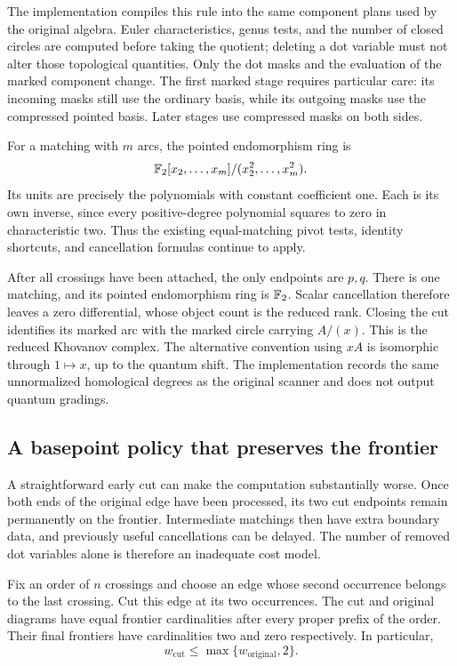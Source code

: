 The implementation compiles this rule into the same component plans used
by the original algebra.  Euler characteristics, genus tests, and the number
of closed circles are computed before taking the quotient; deleting a dot
variable must not alter those topological quantities.  Only the dot masks
and the evaluation of the marked component change.  The first marked stage
requires particular care: its incoming masks still use the ordinary basis,
while its outgoing masks use the compressed pointed basis.  Later stages
use compressed masks on both sides.

For a matching with $m$ arcs, the pointed endomorphism ring is
\[
 \mathbb{F}_2[x_2,\ldots,x_m]/(x_2^2,\ldots,x_m^2).
\]
Its units are precisely the polynomials with constant coefficient one.
Each is its own inverse, since every positive-degree polynomial squares to
zero in characteristic two.  Thus the existing equal-matching pivot tests,
identity shortcuts, and cancellation formulas continue to apply.

After all crossings have been attached, the only endpoints are $p,q$.
There is one matching, and its pointed endomorphism ring is $\mathbb{F}_2$.
Scalar cancellation therefore leaves a zero differential, whose object
count is the reduced rank.  Closing the cut identifies its marked arc with
the marked circle carrying $A/(x)$.  This is the reduced Khovanov complex.
The alternative convention using $xA$ is isomorphic through $1\mapsto x$,
up to the quantum shift.  The implementation records the same unnormalized
homological degrees as the original scanner and does not output quantum
gradings.

\subsection{A basepoint policy that preserves the frontier}

A straightforward early cut can make the computation substantially worse.
Once both ends of the original edge have been processed, its two cut
endpoints remain permanently on the frontier.  Intermediate matchings then
have extra boundary data, and previously useful cancellations can be delayed.
The number of removed dot variables alone is therefore an inadequate cost
model.

\begin{theorem}
\label{thm:lastedgefrontier}
Fix an order of $n$ crossings and choose an edge whose second occurrence
belongs to the last crossing.  Cut this edge at its two occurrences.  The
cut and original diagrams have equal frontier cardinalities after every
proper prefix of the order.  Their final frontiers have cardinalities two
and zero respectively.  In particular,
\[
 w_{\mathrm{cut}}\leq\max\{w_{\mathrm{original}},2\}.
\]
\end{theorem}

